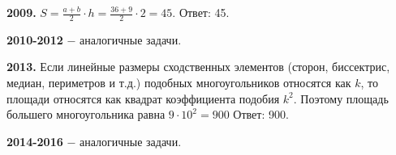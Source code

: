 \textbf{2009.} $S = \frac{a+b}{2}\cdot h = \frac{36+9}{2}\cdot 2=45.$ \newline \null \hspace*{\fill} Ответ: 45.

\textbf{2010-2012} $-$ аналогичные задачи.

\textbf{2013.} Если линейные размеры сходственных элементов (сторон, биссектрис, медиан, периметров и т.д.) подобных многоугольников относятся как $k$, то площади относятся как квадрат коэффициента подобия $k^2$. Поэтому площадь большего многоугольника равна $9\cdot10^2=900$ \newline \null \hspace*{\fill} Ответ: 900.

\textbf{2014-2016} $-$ аналогичные задачи.